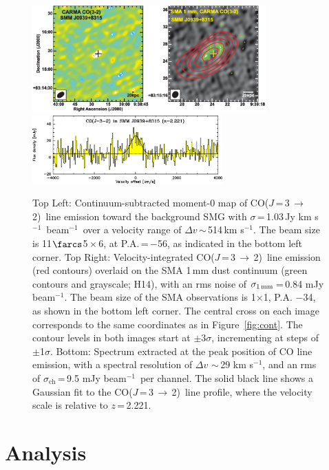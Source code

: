\documentclass[iop]{emulateapj}
\newcommand{\CO}{\mbox{CO($J$\,=\,3\,$\rightarrow$\,2) }}
\newcommand{\pmOne}{\mbox{$^{-1}$}}
\begin{document}
\begin{figure}[tbph]
\centering
\includegraphics[width=0.8\textwidth]{Figure/LinePanel_cmyk.eps}
\includegraphics[width=0.65\textwidth]{Figure/smmj0939-co32_spec.eps}
\caption{Top Left: Continuum-subtracted moment-0 map of \CO line emission toward
the background SMG with $\sigma$\,=\,1.03\,Jy\,\,km\,\,s\pmOne\ beam\pmOne\ over a velocity range of $\Delta v$\,$\sim$\,514\,km\,\,s\pmOne. The beam size is 11$\farcs$5\,$\times$\,6, at P.A.\,=\,$-$56\degr, as indicated in the bottom left corner.
Top Right: Velocity-integrated \CO line emission (red contours) overlaid on the SMA 1\,mm dust continuum (green contours and grayscale; H14), with an rms noise of $\sigma_\textrm{1\,mm}$\,=\,0.84 mJy beam\pmOne. The beam size of the SMA observations is 1$ \times $1, P.A. $-$34\degr, as shown
in the bottom left corner.
The central cross on each image corresponds to the same coordinates as in Figure~\ref{fig:cont}. The contour levels 
in both images
start at $\pm$3$\sigma$, incrementing at
steps of $\pm$1$\sigma$.
Bottom:
Spectrum extracted at the peak position of CO line emission, with a spectral resolution of $\Delta v$ $\sim$\,29 km\,\,s\pmOne, and an rms of $\sigma_\textrm{ch}$\,=\,9.5 mJy beam\pmOne\ per channel. The
solid black line shows a Gaussian fit to the \CO line profile, where the velocity scale is relative to $z$\,=\,2.221.
\label{fig:mom0}}
\end{figure}


\section{Analysis}
\end{document}
